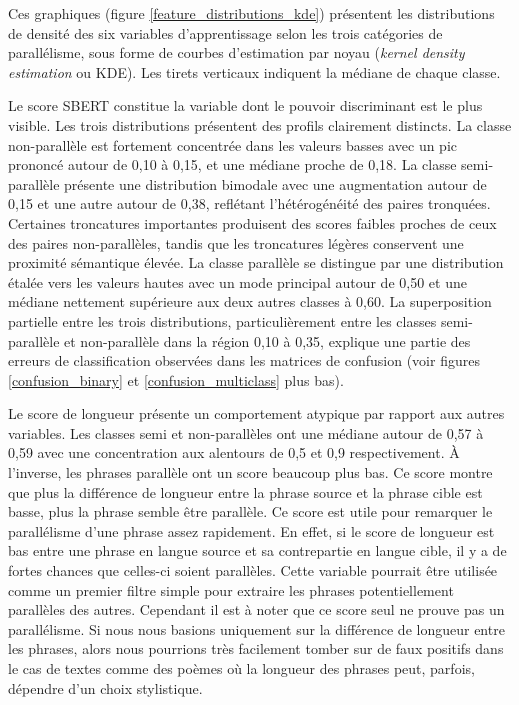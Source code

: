 Ces graphiques (figure \ref{feature_distributions_kde}) présentent les distributions de densité des six variables
d'apprentissage selon les trois catégories de parallélisme, sous forme de courbes d'estimation par noyau (\textit{kernel density estimation} ou KDE).
Les tirets verticaux indiquent la médiane de chaque classe.

Le score SBERT constitue la variable dont le pouvoir discriminant est le plus visible. Les trois distributions
présentent des profils clairement distincts. La classe non-parallèle est fortement concentrée dans les
valeurs basses avec un pic prononcé autour de 0,10 à 0,15, et une médiane proche de 0,18. La classe
semi-parallèle présente une distribution bimodale avec une augmentation autour de 0,15 et une autre autour
de 0,38, reflétant l'hétérogénéité des paires tronquées. Certaines troncatures importantes produisent des
scores faibles proches de ceux des paires non-parallèles, tandis que les troncatures légères conservent une
proximité sémantique élevée. La classe parallèle se distingue par une distribution étalée vers les valeurs
hautes avec un mode principal autour de 0,50 et une médiane nettement supérieure aux deux autres
classes à 0,60. La superposition partielle entre les trois distributions, particulièrement
entre les classes semi-parallèle et non-parallèle dans la région 0,10 à 0,35, explique une partie des
erreurs de classification observées dans les matrices de confusion (voir figures \ref{confusion_binary} et
\ref{confusion_multiclass} plus bas).

Le score de longueur présente un comportement atypique par rapport aux autres variables. Les classes semi et non-parallèles
ont une médiane autour de 0,57 à 0,59 avec une concentration aux alentours de 0,5 et 0,9 respectivement.
À l'inverse, les phrases parallèle ont un score beaucoup plus bas.
Ce score montre que plus la différence de longueur entre la phrase source et la phrase cible est basse, plus la phrase
semble être parallèle. Ce score est utile pour remarquer le parallélisme d'une phrase assez rapidement. En effet,
si le score de longueur est bas entre une phrase en langue source et sa contrepartie en langue cible, il y a de fortes
chances que celles-ci soient parallèles. Cette variable pourrait être utilisée comme un premier filtre simple pour extraire
les phrases potentiellement parallèles des autres. Cependant il est à noter que ce score seul ne prouve pas un
parallélisme. Si nous nous basions uniquement sur la différence de longueur entre les phrases, alors nous
pourrions très facilement tomber sur de faux positifs dans le cas de textes comme des poèmes où la longueur des phrases
peut, parfois, dépendre d'un choix stylistique.

